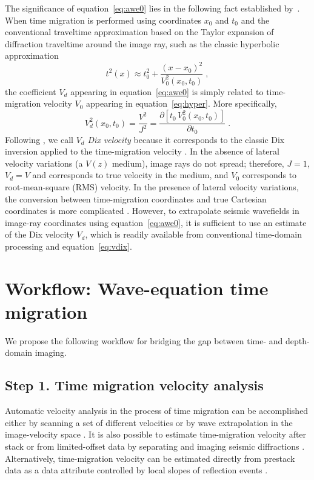 The significance of equation~\ref{eq:awe0} lies in the following
fact established by~\cite{ip}. When time migration is performed using
coordinates $x_0$ and $t_0$ and the conventional traveltime approximation based
on the Taylor expansion of diffraction traveltime around the image
ray, such as the classic hyperbolic approximation
\begin{equation}
\label{eq:hyper}
t^2(x) \approx t_0^2+\frac{(x-x_0)^2}{V_0^2(x_0,t_0)}\;,
\end{equation}
the coefficient $V_d$ appearing in equation~\ref{eq:awe0} is simply
related to time-migration velocity $V_0$ appearing in
equation~\ref{eq:hyper}. More specifically,
\begin{equation}
\label{eq:vdix}
V_d^2(x_0,t_0) = \frac{V^2}{J^2} = \frac{\partial \left[t_0\,V_0^2(x_0,t_0)\right]}{\partial t_0}\;.
\end{equation}
Following \cite{geo}, we call $V_d$ \emph{Dix velocity} because it
corresponds to the classic Dix inversion applied to the time-migration
velocity \cite[]{GEO20-01-00680086}. In the absence of lateral
velocity variations (a $V(z)$ medium), image rays do not spread;
therefore, $J=1$, $V_d=V$ and corresponds to true velocity in the
medium, and $V_0$ corresponds to root-mean-square (RMS) velocity. In
the presence of lateral velocity variations, the conversion between
time-migration coordinates and true Cartesian coordinates is more
complicated \cite[]{GEO60-04-11181127,geo,siwei2}. However, to
extrapolate seismic wavefields in image-ray coordinates using
equation~\ref{eq:awe0}, it is sufficient to use an estimate of the Dix
velocity $V_d$, which is readily available from conventional
time-domain processing and equation~\ref{eq:vdix}.

\section{Workflow: Wave-equation time migration}

We propose the following workflow for bridging the gap between
time- and depth-domain imaging.

\subsection{Step 1. Time migration velocity analysis}

Automatic velocity analysis in the process of time migration
can be accomplished either by scanning a set of different velocities
\cite[]{GEO66-06-16991713} or by wave extrapolation in the
image-velocity space \cite[]{fomel2003time}. It is also possible
to estimate time-migration velocity after stack or from limited-offset
data by separating and imaging seismic
diffractions \cite[]{GEO49-11-18691880,diffr,burnett,dell2011common,coimbra2013migration,decker2017diffraction}. Alternatively,
time-migration velocity can be estimated directly from prestack data
as a data attribute controlled by local slopes of reflection
events \cite[]{pmig,cooke}. 

